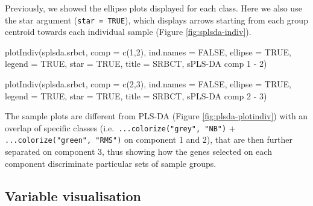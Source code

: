 \documentclass[
]{book}
\newenvironment{Shaded}{\begin{snugshade}}{\end{snugshade}}
\newcommand{\AttributeTok}[1]{\textcolor[rgb]{0.77,0.63,0.00}{#1}}
\newcommand{\ConstantTok}[1]{\textcolor[rgb]{0.00,0.00,0.00}{#1}}
\newcommand{\DecValTok}[1]{\textcolor[rgb]{0.00,0.00,0.81}{#1}}
\newcommand{\FunctionTok}[1]{\textcolor[rgb]{0.00,0.00,0.00}{#1}}
\newcommand{\NormalTok}[1]{#1}
\newcommand{\StringTok}[1]{\textcolor[rgb]{0.31,0.60,0.02}{#1}}
\begin{document}
Previously, we showed the ellipse plots displayed for each class. Here we also use the star argument (\texttt{star\ =\ TRUE}), which displays arrows starting from each group centroid towards each individual sample (Figure \ref{fig:splsda-indiv}).

\begin{Shaded}
\begin{Highlighting}[]
\FunctionTok{plotIndiv}\NormalTok{(splsda.srbct, }\AttributeTok{comp =} \FunctionTok{c}\NormalTok{(}\DecValTok{1}\NormalTok{,}\DecValTok{2}\NormalTok{),}
          \AttributeTok{ind.names =} \ConstantTok{FALSE}\NormalTok{,}
          \AttributeTok{ellipse =} \ConstantTok{TRUE}\NormalTok{, }\AttributeTok{legend =} \ConstantTok{TRUE}\NormalTok{,}
          \AttributeTok{star =} \ConstantTok{TRUE}\NormalTok{,}
          \AttributeTok{title =} \StringTok{\textquotesingle{}SRBCT, sPLS{-}DA comp 1 {-} 2\textquotesingle{}}\NormalTok{)}
\end{Highlighting}
\end{Shaded}

\begin{Shaded}
\begin{Highlighting}[]
\FunctionTok{plotIndiv}\NormalTok{(splsda.srbct, }\AttributeTok{comp =} \FunctionTok{c}\NormalTok{(}\DecValTok{2}\NormalTok{,}\DecValTok{3}\NormalTok{),}
          \AttributeTok{ind.names =} \ConstantTok{FALSE}\NormalTok{,}
          \AttributeTok{ellipse =} \ConstantTok{TRUE}\NormalTok{, }\AttributeTok{legend =} \ConstantTok{TRUE}\NormalTok{,}
          \AttributeTok{star =} \ConstantTok{TRUE}\NormalTok{,}
          \AttributeTok{title =} \StringTok{\textquotesingle{}SRBCT, sPLS{-}DA comp 2 {-} 3\textquotesingle{}}\NormalTok{)}
\end{Highlighting}
\end{Shaded}



The sample plots are different from PLS-DA (Figure \ref{fig:plsda-plotindiv}) with an overlap of specific classes (i.e.~\texttt{...colorize("grey",\ "NB")} + \texttt{...colorize("green",\ "RMS")} on component 1 and 2), that are then further separated on component 3, thus showing how the genes selected on each component discriminate particular sets of sample groups.

\hypertarget{plsda:varplot}{%
\subsection{Variable visualisation}\label{plsda:varplot}}
\end{document}
